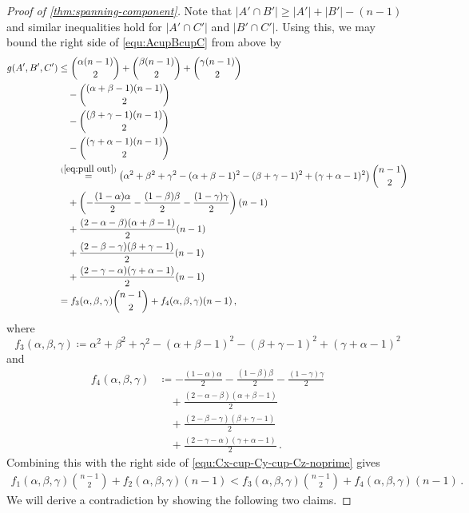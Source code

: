 \documentclass[12pt,reqno]{amsart}
\theoremstyle{plain}
\theoremstyle{definition}
\numberwithin{equation}{section}
\newcommand{\al}{\alpha}
\newcommand{\be}{\beta}
\newcommand{\ce}{\gamma}
\newcommand{\abs}[1]{\left\lvert#1\right\rvert}
\begin{document}
\begin{proof}[Proof of \cref{thm:spanning-component}]
		Note that $\abs{A' \cap B'} \geq \abs{A'} + \abs{B'} -(n-1)$ and similar inequalities hold for $\abs{A' \cap C'}$ and $\abs{B' \cap C'}$. Using this, we may bound the right side of \eqref{equ:AcupBcupC} from above by
		\begin{align*}
			g(A',B',C') &\le \binom{\al(n-1)}{2}+\binom{\be(n-1)}{2}+\binom{\ce(n-1)}{2}
			\\&\quad-\binom{(\al+\be-1)(n-1)}{2} 
			\\&\quad-\binom{(\be+\ce-1)(n-1)}{2} 
			\\&\quad-\binom{(\ce+\al-1)(n-1)}{2}\\
			&\overset{(\ref{eq:pull out})}= \left(\al^2+\be^2+\ce^2-(\al+\be-1)^2-(\be+\ce-1)^2+(\ce+\al-1)^2\right)\binom{n-1}{2} \\
			& \quad+\left(-\frac{(1-\alpha)\alpha}{2}-\frac{(1-\beta)\beta}{2}-\frac{(1-\gamma)\gamma}{2}\right)(n-1)\\
			&\quad +  \frac{(2-\alpha-\beta)(\alpha+\beta-1)}{2} (n-1)
			\\&\quad+\frac{(2-\beta-\gamma)(\beta+\gamma-1)}{2} (n-1)
			\\&\quad+\frac{(2-\gamma-\alpha)(\gamma+\alpha-1)}{2} (n-1)\\
			&=f_3(\alpha,\beta,\gamma)\binom{n-1}{2}+f_4(\alpha,\beta,\gamma)(n-1)\,,
		\end{align*}
		where 
		$$f_3(\alpha,\beta,\gamma)\coloneq\al^2+\be^2+\ce^2-(\al+\be-1)^2-(\be+\ce-1)^2+(\ce+\al-1)^2$$ 
		and 
		\begin{align*}
			f_4(\alpha,\beta,\gamma) & \coloneq -\frac{(1-\alpha)\alpha}{2}-\frac{(1-\beta)\beta}{2}-\frac{(1-\gamma)\gamma}{2}
			\\&\quad+\frac{(2-\alpha-\beta)(\alpha+\beta-1)}{2}
			\\&\quad+\frac{(2-\beta-\gamma)(\beta+\gamma-1)}{2}
			\\&\quad+\frac{(2-\gamma-\alpha)(\gamma+\alpha-1)}{2}\,.
		\end{align*}
		Combining this with the right side of \eqref{equ:Cx-cup-Cy-cup-Cz-noprime} gives
		\begin{align}\label{equ:final}
			f_1(\alpha,\beta,\gamma)\binom{n-1}{2}+f_2(\alpha,\beta,\gamma)(n-1)<f_3(\alpha,\beta,\gamma)\binom{n-1}{2}+f_4(\alpha,\beta,\gamma)(n-1)\,.
		\end{align}
		We will derive a contradiction by showing the following two claims.
		

\end{proof}
\end{document}
